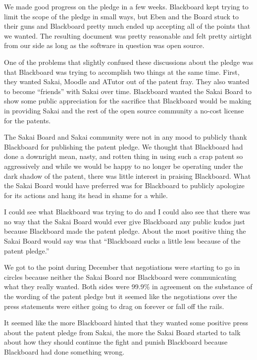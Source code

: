 \documentclass[12pt]{book}
\begin{document}
We made good progress on the pledge in a few weeks.  Blackboard
kept trying to limit the scope of the pledge in small ways,
but Eben and the Board stuck to their guns and Blackboard
pretty much ended up accepting all of the points that we wanted.
The resulting document was pretty reasonable and felt pretty
airtight from our side as long as the software in question
was open source.

One of the problems that slightly confused these discussions
about the pledge was that Blackboard
was trying to accomplish two things at the same time.  First,
they wanted Sakai, Moodle and ATutor out of the patent fray.
They also wanted to become
``friends'' with Sakai over time.  Blackboard wanted the
Sakai Board to show some public appreciation for the sacrifice
that Blackboard would be making in providing Sakai and the
rest of the open source community a no-cost license for
the patents.

The Sakai Board and Sakai community were not in any mood to
publicly thank Blackboard for publishing the patent pledge.
We thought that Blackboard had done a downright mean, nasty,
and rotten thing in using such a crap patent so aggressively
and while we would be happy to no longer be operating
under the dark shadow of the patent, there was little interest
in praising Blackboard.   What the Sakai Board would have
preferred was for Blackboard to publicly apologize for its actions
and hang its head in shame for a while.

I could see what Blackboard was trying to do and I could also see
that there was no way that the Sakai Board would ever give
Blackboard any public kudos just because Blackboard made the patent
pledge.  About the most positive thing the Sakai Board would
say was that ``Blackboard sucks a little less because
of the patent pledge.''

We got to the point during December that
negotiations were starting to go in circles because neither
the Sakai Board nor Blackboard were communicating what
they really wanted.   Both sides were 99.9\% in agreement on the
substance of the wording of the patent pledge but it seemed
like the negotiations over the press statements were either going to
drag on forever or fall off the rails.

It seemed like the more Blackboard hinted that they wanted
some positive press about the patent pledge from Sakai,
the more the Sakai Board started to talk about how
they should continue the fight and punish Blackboard
because Blackboard had done something wrong.
\end{document}
